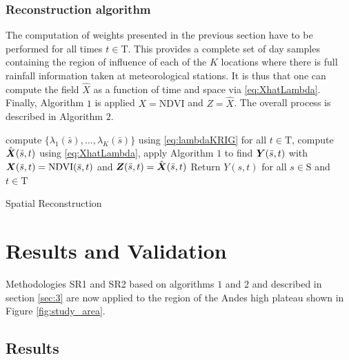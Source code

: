 {\subsubsection{Reconstruction algorithm}

{The computation of weights presented in the previous section have to be performed for all times $t\in\mbox{T}$. This provides a complete set of day samples containing the region of influence of each of the $K$ locations where there is full rainfall information taken at meteorological stations. It is thus that one can compute the field $\hat{X}$ as a function of time and space via \eqref{eq:XhatLambda}. Finally, Algorithm $1$ is applied  $X = \mbox{NDVI}$ and $Z=\hat{X}$. The overall process is described in Algorithm $2$.  \\

\begin{algorithm}[t]
	
	
	
	\begin{algorithmic}[1]
		\STATE  compute $\{\lambda_1(\bar{s}),\ldots,\lambda_K(\bar{s}) \}$ using \eqref{eq:lambdaKRIG} for all $ t\in\mbox{T}$,
		\STATE  compute $\hat{\text{\boldmath$X$}}(\bar{s},t)$ using  \eqref{eq:XhatLambda},
		\STATE apply  Algorithm $1$ to find $\text{\boldmath$Y$}(\bar{s},t)$ with $\text{\boldmath$X$}(\bar{s},t) =  \mbox{NDVI}(\bar{s},t)$ and 
		\STATE $ \text{\boldmath$Z$}(\bar{s},t) = \hat{\text{\boldmath$X$}}(\bar{s},t)$		
		\ENDFOR
		\STATE Return $Y(s,t)$ for all $s\in \mbox{S}$ and $t\in\mbox{T}$ 
	\end{algorithmic}
	\caption{Spatial Reconstruction}
\end{algorithm}
}


\section{Results and Validation}  \label{sec:4}

Methodologies SR1 and SR2 based on algorithms $1$ and $2$ and described in section \ref{sec:3} are now applied to the region of the Andes high plateau shown in Figure \ref{fig:study_area}. 


\subsection{Results}

}

